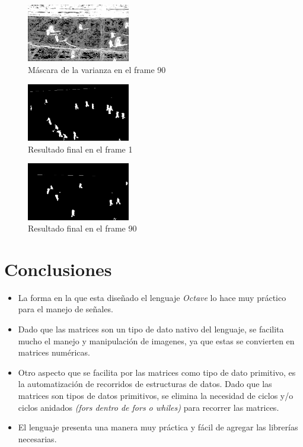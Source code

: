 \documentclass{IEEEtran}
\begin{document}
\begin{figure}[!ht]
  \caption{M\'ascara de la varianza en el frame 90}
  \centering
    \includegraphics[width=0.4\textwidth]{frameVarianza90.png}
\end{figure}

\begin{figure}[!ht]
  \caption{Resultado final en el frame 1}
  \centering
    \includegraphics[width=0.4\textwidth]{frameFinal.png}
\end{figure}

\begin{figure}[!ht]
  \caption{Resultado final en el frame 90}
  \centering
    \includegraphics[width=0.4\textwidth]{frameFinal90.png}
\end{figure}

\newpage

\section{Conclusiones}

\begin{itemize}
\item La forma en la que esta dise\~nado el lenguaje \emph{Octave} lo hace muy pr\'actico para el manejo de se\~nales.
\item Dado que las matrices son un tipo de dato nativo del lenguaje, se facilita mucho el manejo y manipulaci\'on de imagenes, ya que estas se convierten en matrices num\'ericas.
\item Otro aspecto que se facilita por las matrices como tipo de dato primitivo, es la automatizaci\'on de recorridos de estructuras de datos. Dado que las matrices son tipos de datos primitivos, se elimina la necesidad de ciclos y/o ciclos anidados \emph{(fors dentro de fors o whiles)} para recorrer las matrices.
\item El lenguaje presenta una manera muy pr\'actica y f\'acil de agregar las librer\'ias necesarias.
\end{itemize}
\end{document}
